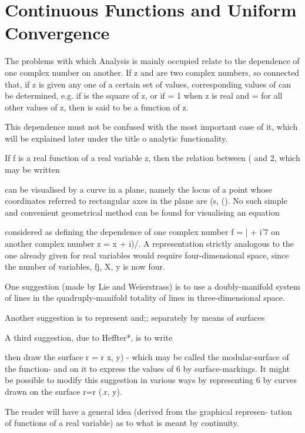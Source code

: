 \chapter{Continuous Functions and Uniform Convergence} 


The problems with which Analysis is mainly occupied relate to the
dependence of one complex number on another. If z and are two complex
numbers, so connected that, if z is given any one of a certain set of
values, corresponding values of can be determined, e.g. if is the
square of z, or if = 1 when z is real and = for all other values of z,
then is said to be a function of z.

This dependence must not be confused with the most important case of
it, which will be explained later under the title o analytic
functionality.

If f is a real function of a real variable z, then the relation
between ( and 2, which may be written

can be visualised by a curve in a plane, namely the locus of a point
whose coordinates referred to rectangular axes in the plane are (s,
(). No such simple and convenient geometrical method can be found for
visualising an equation

considered as defining the dependence of one complex number f = | +
i'7 on another complex number z = x + i)/. A representation strictly
analogous to the one already given for real variables would require
four-dimensional space, since the number of variables, fj, X, y is
now four.

One suggestion (made by Lie and Weierstrass) is to use a
doubly-manifold system of lines in the quadruply-manifold totality of
lines in three-dimensional space.

Another suggestion is to represent and;; separately by means of
surfaces

A third suggestion, due to Heffter*, is to write

then draw the surface r = r x, y) - which may be called the
modular-surface of the function- and on it to express the values of 6
by surface-markings. It might be possible to modify this suggestion in
various ways by representing 6 by curves drawn on the surface r=r (.r,
y).


The reader will have a general idea (derived from the graphical
represen- tation of functions of a real variable) as to what is meant
by continuity.

